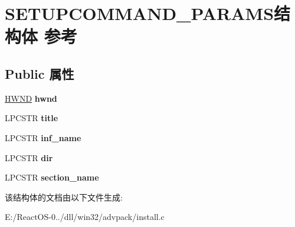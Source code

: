 \hypertarget{struct_s_e_t_u_p_c_o_m_m_a_n_d___p_a_r_a_m_s}{}\section{S\+E\+T\+U\+P\+C\+O\+M\+M\+A\+N\+D\+\_\+\+P\+A\+R\+A\+M\+S结构体 参考}
\label{struct_s_e_t_u_p_c_o_m_m_a_n_d___p_a_r_a_m_s}
\subsection*{Public 属性}
\begin{DoxyCompactItemize}
\item 
\mbox{\label{struct_s_e_t_u_p_c_o_m_m_a_n_d___p_a_r_a_m_s_a7469d6345df509a04282bc021498affa}} 
\hyperlink{interfacevoid}{H\+W\+ND} {\bfseries hwnd}
\item 
\mbox{\label{struct_s_e_t_u_p_c_o_m_m_a_n_d___p_a_r_a_m_s_a960fdc0413b9cd267f133db753bfa831}} 
L\+P\+C\+S\+TR {\bfseries title}
\item 
\mbox{\label{struct_s_e_t_u_p_c_o_m_m_a_n_d___p_a_r_a_m_s_aa2dcbfcd2f43db39123340c3a8ef11d9}} 
L\+P\+C\+S\+TR {\bfseries inf\+\_\+name}
\item 
\mbox{\label{struct_s_e_t_u_p_c_o_m_m_a_n_d___p_a_r_a_m_s_ae06d47db4a11fbe3dc4bcc900a82e7ec}} 
L\+P\+C\+S\+TR {\bfseries dir}
\item 
\mbox{\label{struct_s_e_t_u_p_c_o_m_m_a_n_d___p_a_r_a_m_s_a93edcccb012d65f946f17c345a0dd0bc}} 
L\+P\+C\+S\+TR {\bfseries section\+\_\+name}
\end{DoxyCompactItemize}


该结构体的文档由以下文件生成\+:\begin{DoxyCompactItemize}
\item 
E\+:/\+React\+O\+S-\/0../dll/win32/advpack/install.\+c\end{DoxyCompactItemize}
